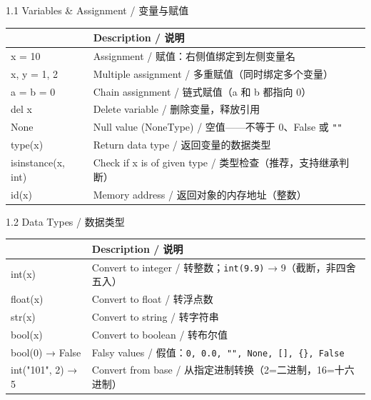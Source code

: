 \documentclass[11pt,a4paper]{report}
\let\oldtexttt\texttt
\renewcommand{\texttt}[1]{\textcolor{mainblue}{\oldtexttt{#1}}}
\begin{document}
\begin{cmdsection}{1.1  Variables \& Assignment / 变量与赋值}
\small\renewcommand{\arraystretch}{1.4}
\centering
\begin{tabularx}{\textwidth}{@{}>{\ttfamily}l>{\raggedright\arraybackslash}X@{}}
\toprule
\multicolumn{1}{@{}l}{\textbf{Syntax}} & \textbf{Description / 说明} \\ \midrule
x = 10                  & Assignment / 赋值：右侧值绑定到左侧变量名 \\
x, y = 1, 2             & Multiple assignment / 多重赋值（同时绑定多个变量） \\
a = b = 0               & Chain assignment / 链式赋值（a 和 b 都指向 0） \\
del x                   & Delete variable / 删除变量，释放引用 \\
None                    & Null value (NoneType) / 空值——不等于 0、False 或 \texttt{""} \\
type(x)                 & Return data type / 返回变量的数据类型 \\
isinstance(x, int)      & Check if x is of given type / 类型检查（推荐，支持继承判断） \\
id(x)                   & Memory address / 返回对象的内存地址（整数） \\
\bottomrule
\end{tabularx}
\end{cmdsection}

\begin{cmdsection}{1.2  Data Types / 数据类型}
\normalsize\renewcommand{\arraystretch}{1.4}
\centering
\begin{tabularx}{\textwidth}{@{}>{\ttfamily}l>{\raggedright\arraybackslash}X@{}}
\toprule
\multicolumn{1}{@{}l}{\textbf{Syntax}} & \textbf{Description / 说明} \\ \midrule
int(x)                  & Convert to integer / 转整数；\texttt{int(9.9)} → 9（截断，非四舍五入） \\
float(x)                & Convert to float / 转浮点数 \\
str(x)                  & Convert to string / 转字符串 \\
bool(x)                 & Convert to boolean / 转布尔值 \\
bool(0) → False         & Falsy values / 假值：\texttt{0, 0.0, "", None, [], \{\}, False} \\
int("101", 2) → 5       & Convert from base / 从指定进制转换（2=二进制，16=十六进制） \\
\bottomrule
\end{tabularx}
\end{cmdsection}
\end{document}
